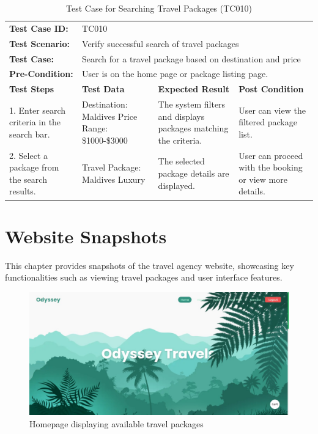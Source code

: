 \documentclass{scrreprt}
\begin{document}
    \begin{longtable}{| m{2cm} | m{5cm} | m{4cm} | m{3cm} |}
    \caption{Test Case for Searching Travel Packages (TC010)}
    \vspace{0.5cm} \\ \hline
    \textbf{Test Case ID:} & \multicolumn{3}{l|}{TC010} \\ \hline
    \textbf{Test Scenario:} & \multicolumn{3}{l|}{Verify successful search of travel packages} \\ \hline
    \textbf{Test Case:} & \multicolumn{3}{l|}{Search for a travel package based on destination and price} \\ \hline
    \textbf{Pre-Condition:} & \multicolumn{3}{l|}{User is on the home page or package listing page.} \\ \hline
    \textbf{Test Steps} & \textbf{Test Data} & \textbf{Expected Result} & \textbf{Post Condition} \\ \hline
    1. Enter search criteria in the search bar. & Destination: Maldives \newline Price Range: \$1000-\$3000 & The system filters and displays packages matching the criteria. & User can view the filtered package list. \\ \hline
    2. Select a package from the search results. & Travel Package: Maldives Luxury & The selected package details are displayed. & User can proceed with the booking or view more details. \\ \hline
    \end{longtable}

    \chapter{Website Snapshots}

This chapter provides snapshots of the travel agency website, showcasing key functionalities such as viewing travel packages and user interface features.

\begin{figure}[h!]
    \centering
    \includegraphics[width=1.1\textwidth, height=0.35\textheight]{./SS/home.jpg}
    \caption{Homepage displaying available travel packages}
    \label{fig:homepage}
\end{figure}
\end{document}
